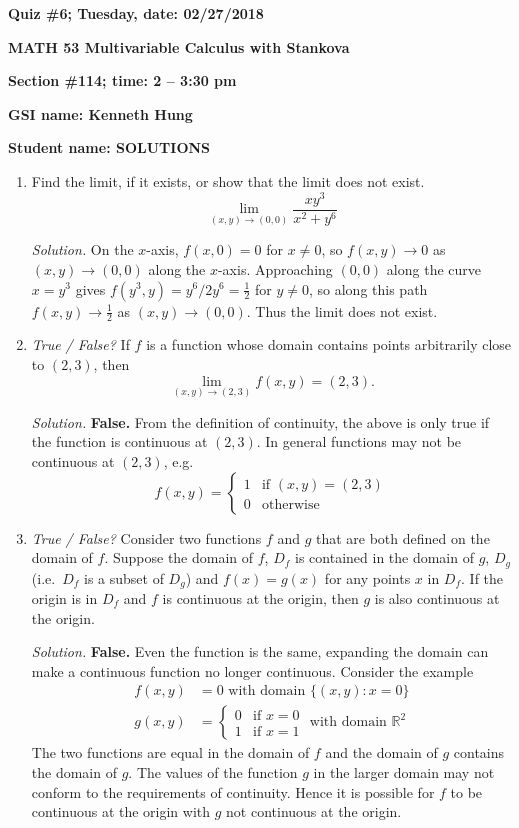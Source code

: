 \documentclass{article}
\begin{document}
{\bf Quiz \#6; Tuesday, date: 02/27/2018}

{\bf MATH 53 Multivariable Calculus with Stankova}

{\bf Section \#114; time: 2 -- 3:30 pm}

{\bf GSI name: Kenneth Hung}

{\bf Student name: SOLUTIONS}

\vspace*{0.25in}

\begin{enumerate}
\item Find the limit, if it exists, or show that the limit does not exist.
\[
\lim_{(x, y) \to (0, 0)} \frac{xy^3}{x^2 + y^6}
\]

{\em Solution.} On the $x$-axis, $f(x, 0) = 0$ for $x \ne 0$, so $f(x, y) \to 0$ as $(x, y) \to (0, 0)$ along the $x$-axis. Approaching $(0, 0)$ along the curve $x = y^3$ gives $f(y^3, y) = y^6 / 2y^6 = \frac{1}{2}$ for $y \ne 0$, so along this path $f(x, y) \to \frac{1}{2}$ as $(x, y) \to (0, 0)$. Thus the limit does not exist.

\item {\em True / False?} If $f$ is a function whose domain contains points arbitrarily close to $(2, 3)$, then
\[
\lim_{(x, y) \to (2, 3)} f(x, y) = (2, 3).
\]

{\em Solution.} {\bf False.} From the definition of continuity, the above is only true if the function is continuous at $(2, 3)$. In general functions may not be continuous at $(2, 3)$, e.g.
\[
f(x, y) = \begin{cases}
1 & \text{if } (x, y) = (2, 3) \\
0 & \text{otherwise}
\end{cases}
\]

\item {\em True / False?} Consider two functions $f$ and $g$ that are both defined on the domain of $f$.  Suppose the domain of $f$, $D_f$ is contained in the domain of $g$, $D_g$ (i.e.\ $D_f$ is a subset of $D_g$) and $f(x) = g(x)$ for any points $x$ in $D_f$. If the origin is in $D_f$ and $f$ is continuous at the origin, then $g$ is also continuous at the origin.

{\em Solution.} {\bf False.} Even the function is the same, expanding the domain can make a continuous function no longer continuous. Consider the example
\begin{align*}
f(x, y) & = 0 \text{ with domain } \{(x, y): x = 0\} \\
g(x, y) & = \begin{cases}
0 & \text{if } x = 0 \\
1 & \text{if } x = 1
\end{cases} \text{ with domain } \mathbb{R}^2
\end{align*}
The two functions are equal in the domain of $f$ and the domain of $g$ contains the domain of $g$. The values of the function $g$ in the larger domain may not conform to the requirements of continuity. Hence it is possible for $f$ to be continuous at the origin with $g$ not continuous at the origin.
\end{enumerate}
\end{document}
